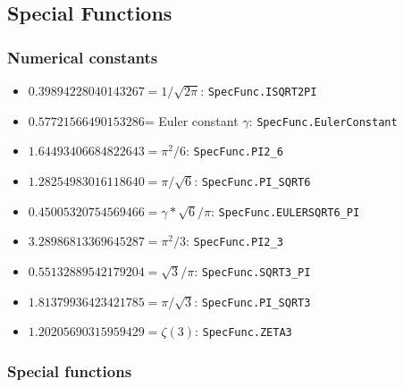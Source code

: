 

\newpage
{}
\subsection{Special Functions}

\subsubsection{Numerical constants}

\begin{itemize}
\item $ 0.39894228040143267 = 1 / \sqrt{2\pi}$:
\verb|SpecFunc.ISQRT2PI|
\item $ 0.57721566490153286$= Euler constant $\gamma$:
\verb|SpecFunc.EulerConstant|
\item $  1.64493406684822643 = \pi^2 / 6$:
\verb|SpecFunc.PI2_6|
\item $  1.28254983016118640 = \pi / \sqrt{6}$:
\verb|SpecFunc.PI_SQRT6|
\item $ 0.45005320754569466 = \gamma * \sqrt{6} / \pi$:
\verb|SpecFunc.EULERSQRT6_PI|
\item $ 3.28986813369645287 = \pi^2 / 3$:
\verb|SpecFunc.PI2_3|
\item $ 0.55132889542179204 = \sqrt{3} / \pi$:
\verb|SpecFunc.SQRT3_PI|
\item $ 1.81379936423421785 = \pi / \sqrt{3}$:
\verb|SpecFunc.PI_SQRT3|
\item $ 1.20205690315959429 = \zeta(3)$:
\verb|SpecFunc.ZETA3|
\end{itemize}


\subsubsection{Special functions}

